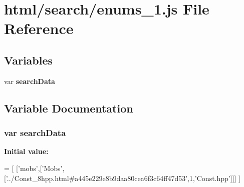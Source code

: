 \section{html/search/enums\-\_\-1.js File Reference}
\label{enums__1_8js}
\subsection*{Variables}
\begin{DoxyCompactItemize}
\item 
var {\bf search\-Data}
\end{DoxyCompactItemize}


\subsection{Variable Documentation}
\subsubsection[{search\-Data}]{\setlength{\rightskip}{0pt plus 5cm}var search\-Data}\label{enums__1_8js_ad01a7523f103d6242ef9b0451861231e}
{\bfseries Initial value\-:}
\begin{DoxyCode}
=
[
  [\textcolor{stringliteral}{'mobs'},[\textcolor{stringliteral}{'Mobs'},[\textcolor{stringliteral}{'../Const\_8hpp.html#a445e229e8b9daa80cea6f3c64ff47d53'},1,\textcolor{stringliteral}{'Const.hpp'}]]]
]
\end{DoxyCode}
